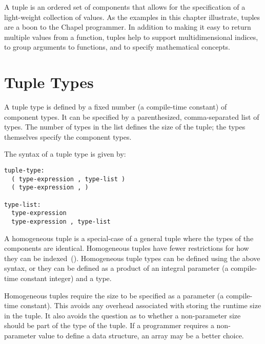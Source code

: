 \label{Tuples}

A tuple is an ordered set of components that allows for the
specification of a light-weight collection of values.  As the examples
in this chapter illustrate, tuples are a boon to the Chapel
programmer.  In addition to making it easy to return multiple values
from a function, tuples help to support multidimensional indices, to
group arguments to functions, and to specify mathematical concepts.

\section{Tuple Types}
\label{Tuple_Types}

A tuple type is defined by a fixed number (a compile-time constant) of
component types.  It can be specified by a parenthesized,
comma-separated list of types.  The number of types in the list
defines the size of the tuple; the types themselves specify the
component types.

The syntax of a tuple type is given by:
\begin{syntax}
\begin{verbatim}
tuple-type:
  ( type-expression , type-list )
  ( type-expression , )

type-list:
  type-expression
  type-expression , type-list
\end{verbatim}
\end{syntax}

A homogeneous tuple is a special-case of a general tuple where the
types of the components are identical.  Homogeneous tuples have fewer
restrictions for how they can be indexed~().
Homogeneous tuple types can be defined using the above syntax, or they
can be defined as a product of an integral parameter (a compile-time
constant integer) and a type.

\begin{rationale}
Homogeneous tuples require the size to be specified as a parameter
(a compile-time constant).  This avoids any overhead associated with
storing the runtime size in the tuple.  It also avoids the question as
to whether a non-parameter size should be part of the type of the
tuple.  If a programmer requires a non-parameter value to define a
data structure, an array may be a better choice.
\end{rationale}

